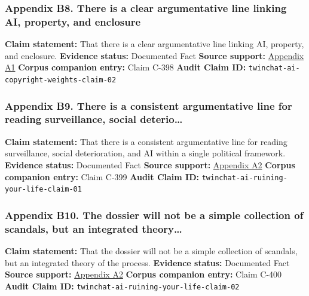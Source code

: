 \documentclass[
  american,
  11pt,
  letterpaper,
]{article}
\begin{document}
\subsubsection{Appendix B8. There is a clear argumentative line linking
AI, property, and
enclosure}\label{ch-00-appendix-b8-there-is-a-clear-argumentative-line-linking-ai-property-and-enclosure}

\textbf{Claim statement:} That there is a clear argumentative line
linking AI, property, and enclosure. \textbf{Evidence status:}
Documented Fact \textbf{Source support:}
\hyperref[ch-00-appendix-a1-ai-copyright-weights-a-new-frontier-in-intellectual-property-law]{Appendix
A1} \textbf{Corpus companion entry:} Claim C-398 \textbf{Audit Claim
ID:} \texttt{twinchat-ai-copyright-weights-claim-02}

\subsubsection{Appendix B9. There is a consistent argumentative line for
reading surveillance, social
deterio\ldots{}}\label{ch-00-appendix-b9-there-is-a-consistent-argumentative-line-for-reading-surveillance-social-deterio}

\textbf{Claim statement:} That there is a consistent argumentative line
for reading surveillance, social deterioration, and AI within a single
political framework. \textbf{Evidence status:} Documented Fact
\textbf{Source support:}
\hyperref[ch-00-appendix-a2-how-ai-is-ruining-your-life-to-build-an-empire]{Appendix
A2} \textbf{Corpus companion entry:} Claim C-399 \textbf{Audit Claim
ID:} \texttt{twinchat-ai-ruining-your-life-claim-01}

\subsubsection{Appendix B10. The dossier will not be a simple collection
of scandals, but an integrated
theory\ldots{}}\label{ch-00-appendix-b10-the-dossier-will-not-be-a-simple-collection-of-scandals-but-an-integrated-theory}

\textbf{Claim statement:} That the dossier will not be a simple
collection of scandals, but an integrated theory of the process.
\textbf{Evidence status:} Documented Fact \textbf{Source support:}
\hyperref[ch-00-appendix-a2-how-ai-is-ruining-your-life-to-build-an-empire]{Appendix
A2} \textbf{Corpus companion entry:} Claim C-400 \textbf{Audit Claim
ID:} \texttt{twinchat-ai-ruining-your-life-claim-02}
\end{document}
